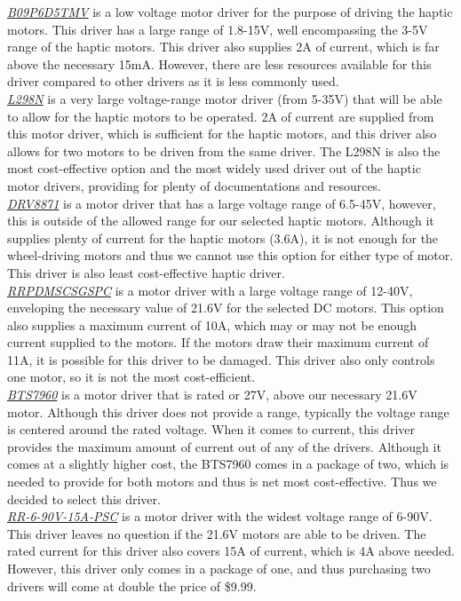 \noindent \underline{\textit{B09P6D5TMV}} is a low voltage motor driver for the purpose of driving the haptic motors. This driver has a large range of 1.8-15V, well encompassing the 3-5V range of the haptic motors. This driver also supplies 2A of current, which is far above the necessary 15mA. However, there are less resources available for this driver compared to other drivers as it is less commonly used.\\

\noindent \underline{\textit{L298N}} is a very large voltage-range motor driver (from 5-35V) that will be able to allow for the haptic motors to be operated. 2A of current are supplied from this motor driver, which is sufficient for the haptic motors, and this driver also allows for two motors to be driven from the same driver. The L298N is also the most cost-effective option and the most widely used driver out of the haptic motor drivers, providing for plenty of documentations and resources.\\

\noindent \underline{\textit{DRV8871}} is a motor driver that has a large voltage range of 6.5-45V, however, this is outside of the allowed range for our selected haptic motors. Although it supplies plenty of current for the haptic motors (3.6A), it is not enough for the wheel-driving motors and thus we cannot use this option for either type of motor. This driver is also least cost-effective haptic driver.\\
 
\noindent \underline{\textit{RRPDMSCSGSPC}} is a motor driver with a large voltage range of 12-40V, enveloping the necessary value of 21.6V for the selected DC motors. This option also supplies a maximum current of 10A, which may or may not be enough current supplied to the motors. If the motors draw their maximum current of 11A, it is possible for this driver to be damaged. This driver also only controls one motor, so it is not the most cost-efficient.\\
 
\noindent \underline{\textit{BTS7960}} is a motor driver that is rated or 27V, above our necessary 21.6V motor. Although this driver does not provide a range, typically the voltage range is centered around the rated voltage. When it comes to current, this driver provides the maximum amount of current out of any of the drivers. Although it comes at a slightly higher cost, the BTS7960 comes in a package of two, which is needed to provide for both motors and thus is net most cost-effective. Thus we decided to select this driver.\\
 
\noindent \underline{\textit{RR-6-90V-15A-PSC}} is a motor driver with the widest voltage range of 6-90V. This driver leaves no question if the 21.6V motors are able to be driven. The rated current for this driver also covers 15A of current, which is 4A above needed. However, this driver only comes in a package of one, and thus purchasing two drivers will come at double the price of \$9.99.\\

